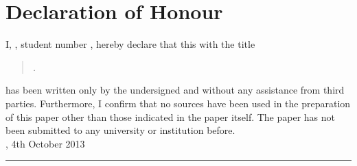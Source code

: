 
\chapter*{Declaration of Honour}

\thispagestyle{empty}

I, \myAuthor, student number \studentno, hereby declare that this \kind\xspace with the title

\begin{quote}
\textit{\myTitle. \mySubtitle}
\end{quote}

has been written only by the undersigned and without any assistance from third parties.
Furthermore, I confirm that no sources have been used in the preparation of this paper other than those indicated in the paper itself. The paper has not been submitted to any university or institution before. \\[6ex]

\place, 4th October 2013\\[3ex]


\rule[-0.2cm]{5cm}{0.5pt}

\textsc{\myAuthor} 